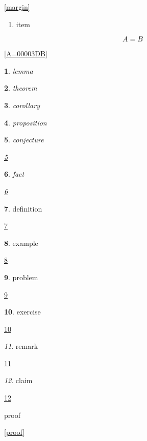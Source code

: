 \documentclass[english]{book}
\makeatletter
\theoremstyle{plain}
\newtheorem{thm}{\protect\theoremname}
\theoremstyle{plain}
\newtheorem{lem}[thm]{\protect\lemmaname}
\theoremstyle{plain}
\newtheorem{cor}[thm]{\protect\corollaryname}
\theoremstyle{plain}
\newtheorem{prop}[thm]{\protect\propositionname}
\theoremstyle{plain}
\newtheorem{conjecture}[thm]{\protect\conjecturename}
\theoremstyle{plain}
\newtheorem{fact}[thm]{\protect\factname}
\theoremstyle{definition}
\newtheorem{defn}[thm]{\protect\definitionname}
\theoremstyle{definition}
\newtheorem{example}[thm]{\protect\examplename}
\theoremstyle{definition}
\newtheorem{problem}[thm]{\protect\problemname}
\theoremstyle{definition}
\newtheorem{xca}[thm]{\protect\exercisename}
\theoremstyle{remark}
\newtheorem{rem}[thm]{\protect\remarkname}
\theoremstyle{remark}
\newtheorem{claim}[thm]{\protect\claimname}
\newenvironment{proof}[1][\protect\proofname]{\par
\normalfont\topsep6\p@\@plus6\p@\relax
\trivlist
\itemindent\parindent
\item[\hskip\labelsep\scshape #1]\ignorespaces
}{%
\endtrivlist\@endpefalse
}
\providecommand{\proofname}{Proof}
\providecommand{\claimname}{Claim}
\providecommand{\conjecturename}{Conjecture}
\providecommand{\corollaryname}{Corollary}
\providecommand{\definitionname}{Definition}
\providecommand{\examplename}{Example}
\providecommand{\exercisename}{Exercise}
\providecommand{\factname}{Fact}
\providecommand{\lemmaname}{Lemma}
\providecommand{\problemname}{Problem}
\providecommand{\propositionname}{Proposition}
\providecommand{\remarkname}{Remark}
\providecommand{\theoremname}{Theorem}
\makeatother
\begin{document}

\ref{margin}
\begin{enumerate}
\item item\label{enu:item}
\end{enumerate}

\begin{equation}
A=B\label{eq:A=00003DB}
\end{equation}


\eqref{A=00003DB}
\begin{lem}
lemma\label{lem:lemma}

\end{lem}
\begin{thm}
theorem\label{thm:theorem}

\end{thm}
\begin{cor}
corollary\label{cor:corollary}

\end{cor}
\begin{prop}
proposition\label{prop:proposition}

\end{prop}
\begin{conjecture}
conjecture\label{conjecture}

\ref{conjecture}\end{conjecture}
\begin{fact}
fact\label{fact}

\ref{fact}\end{fact}
\begin{defn}
definition\label{definition}

\ref{definition}\end{defn}
\begin{example}
example\label{example}

\ref{example}\end{example}
\begin{problem}
problem\label{problem}

\ref{problem}\end{problem}
\begin{xca}
exercise\label{exercise}

\ref{exercise}\end{xca}
\begin{rem}
remark\label{remark}

\ref{remark}\end{rem}
\begin{claim}
claim\label{claim}

\ref{claim}\end{claim}
\begin{proof}
proof\label{proof}

\ref{proof}\end{proof}
\end{document}
